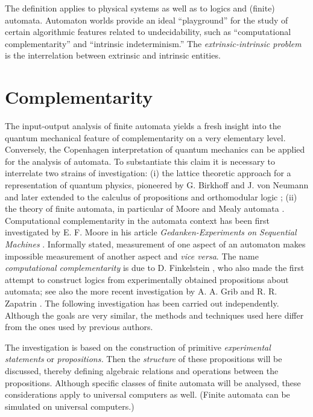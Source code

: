 \documentclass{article}
\begin{document}
 The definition applies to physical systems as well as to
 logics and (finite)
 automata. Automaton worlds provide an ideal ``playground'' for the
 study of certain algorithmic features related to undecidability, such
 as ``computational complementarity''
 and ``intrinsic
 indeterminism.''
 The {\em extrinsic-intrinsic problem} is the interrelation between
 extrinsic and intrinsic entities.


\section{Complementarity}
The input-output analysis of finite automata
yields a fresh insight into the quantum mechanical feature of
complementarity on a very elementary level.
Conversely,
the Copenhagen interpretation of quantum mechanics
\cite{jammer,wheeler-zurek} can be applied for the analysis of automata.
To substantiate this claim it is necessary to interrelate two strains
of investigation:
(i)
the lattice theoretic \cite{birkhoff} approach for a representation
of quantum physics, pioneered by G. Birkhoff and J. von Neumann
\cite{birkhoff-Neumann}
and later  extended to the calculus of propositions
\cite{jauch,piron} and
 orthomodular logic
\cite{kalmbach-83,kalmbach-86,pulmannova,giuntini};
(ii)
the theory of finite automata, in particular of Moore and Mealy
automata \cite{moore,mealy,conway,brauer-84}.
Computational complementarity in the automata context
 has been first investigated by
 E. F. Moore in his article {\sl Gedanken-Experiments on Sequential
 Machines}
 \cite{moore}.
Informally  stated,
 measurement of one aspect of an automaton
 makes impossible measurement of another aspect and {\it vice
versa}.
The name
{\em computational complementarity}
is due to
 D. Finkelstein
\cite{finkelstein-79,finkelstein-83}, who also made the first
attempt
to construct logics from experimentally obtained
propositions about automata; see also the more recent investigation
by A. A. Grib and
R. R. Zapatrin
 \cite{gribza}.
The following investigation has been carried out independently.
Although the goals are very similar, the methods and techniques
used here differ from the ones used by previous authors.


 The investigation is based on  the construction of
primitive
 {\em experimental statements} or {\em
propositions.} Then the {\em  structure} of these
propositions will be discussed, thereby defining
algebraic relations and operations between the propositions.
Although specific classes of finite automata will be analysed,
these considerations apply to universal computers as well.
(Finite automata can be simulated on universal computers.)
\end{document}
